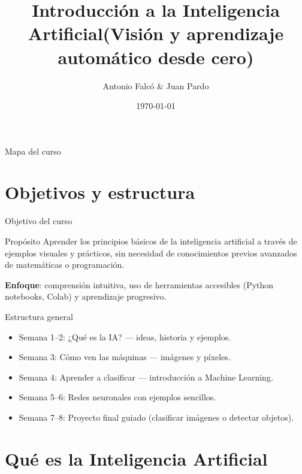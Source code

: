 \documentclass[10pt,aspectratio=169]{beamer}
\title{Introducción a la Inteligencia Artificial\newline\large (Visión y aprendizaje automático desde cero)}
\author{Antonio Falcó \& Juan Pardo}
\institute{Máster en IA y Fabricación Aditiva — ESET}
\date{\today}
\begin{document}
\begin{frame}[plain]
  \titlepage
\end{frame}

\begin{frame}{Mapa del curso}
  \tableofcontents
\end{frame}

\section{Objetivos y estructura}

\begin{frame}{Objetivo del curso}
  \begin{block}{Propósito}
    Aprender los principios básicos de la inteligencia artificial a través de ejemplos visuales y prácticos, sin necesidad de conocimientos previos avanzados de matemáticas o programación.
  \end{block}
  \vspace{0.4em}
  \textbf{Enfoque}: comprensión intuitiva, uso de herramientas accesibles (Python notebooks, Colab) y aprendizaje progresivo.
\end{frame}

\begin{frame}{Estructura general}
  \begin{itemize}
    \item Semana 1–2: ¿Qué es la IA? — ideas, historia y ejemplos.
    \item Semana 3: Cómo ven las máquinas — imágenes y píxeles.
    \item Semana 4: Aprender a clasificar — introducción a Machine Learning.
    \item Semana 5–6: Redes neuronales con ejemplos sencillos.
    \item Semana 7–8: Proyecto final guiado (clasificar imágenes o detectar objetos).
  \end{itemize}
\end{frame}

\section{Qué es la Inteligencia Artificial}
\end{document}
